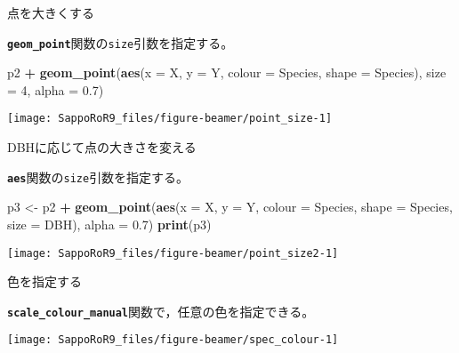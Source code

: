 \documentclass[ignorenonframetext,]{beamer}
\newenvironment{Shaded}{\begin{snugshade}}{\end{snugshade}}
\newcommand{\KeywordTok}[1]{\textcolor[rgb]{0.13,0.29,0.53}{\textbf{#1}}}
\newcommand{\DataTypeTok}[1]{\textcolor[rgb]{0.13,0.29,0.53}{#1}}
\newcommand{\DecValTok}[1]{\textcolor[rgb]{0.00,0.00,0.81}{#1}}
\newcommand{\FloatTok}[1]{\textcolor[rgb]{0.00,0.00,0.81}{#1}}
\newcommand{\StringTok}[1]{\textcolor[rgb]{0.31,0.60,0.02}{#1}}
\newcommand{\OperatorTok}[1]{\textcolor[rgb]{0.81,0.36,0.00}{\textbf{#1}}}
\newcommand{\NormalTok}[1]{#1}
\let\oldShaded\Shaded
\let\endoldShaded\endShaded
\renewenvironment{Shaded}{\footnotesize\oldShaded}{\endoldShaded}
\begin{document}
\begin{frame}[fragile]{点を大きくする}

\textbf{\texttt{geom\_point}}関数の\texttt{size}引数を指定する。

\begin{Shaded}
\begin{Highlighting}[]
\NormalTok{p2 }\OperatorTok{+}\StringTok{ }\KeywordTok{geom_point}\NormalTok{(}\KeywordTok{aes}\NormalTok{(}\DataTypeTok{x =}\NormalTok{ X, }\DataTypeTok{y =}\NormalTok{ Y,}
                    \DataTypeTok{colour =}\NormalTok{ Species, }\DataTypeTok{shape =}\NormalTok{ Species),}
                \DataTypeTok{size =} \DecValTok{4}\NormalTok{, }\DataTypeTok{alpha =} \FloatTok{0.7}\NormalTok{)}
\end{Highlighting}
\end{Shaded}

\texttt{[image: SappoRoR9\_files/figure-beamer/point\_size-1]}

\end{frame}

\begin{frame}[fragile]{DBHに応じて点の大きさを変える}

\textbf{\texttt{aes}}関数の\texttt{size}引数を指定する。

\begin{Shaded}
\begin{Highlighting}[]
\NormalTok{p3 <-}\StringTok{ }\NormalTok{p2 }\OperatorTok{+}
\StringTok{  }\KeywordTok{geom_point}\NormalTok{(}\KeywordTok{aes}\NormalTok{(}\DataTypeTok{x =}\NormalTok{ X, }\DataTypeTok{y =}\NormalTok{ Y, }
                 \DataTypeTok{colour =}\NormalTok{ Species, }\DataTypeTok{shape =}\NormalTok{ Species, }\DataTypeTok{size =}\NormalTok{ DBH),}
             \DataTypeTok{alpha =} \FloatTok{0.7}\NormalTok{)}
\KeywordTok{print}\NormalTok{(p3)}
\end{Highlighting}
\end{Shaded}

\texttt{[image: SappoRoR9\_files/figure-beamer/point\_size2-1]}

\end{frame}

\begin{frame}[fragile]{色を指定する}

\textbf{\texttt{scale\_colour\_manual}}関数で，任意の色を指定できる。

\begin{Shaded}
\end{Shaded}

\texttt{[image: SappoRoR9\_files/figure-beamer/spec\_colour-1]}

\end{frame}
\end{document}
